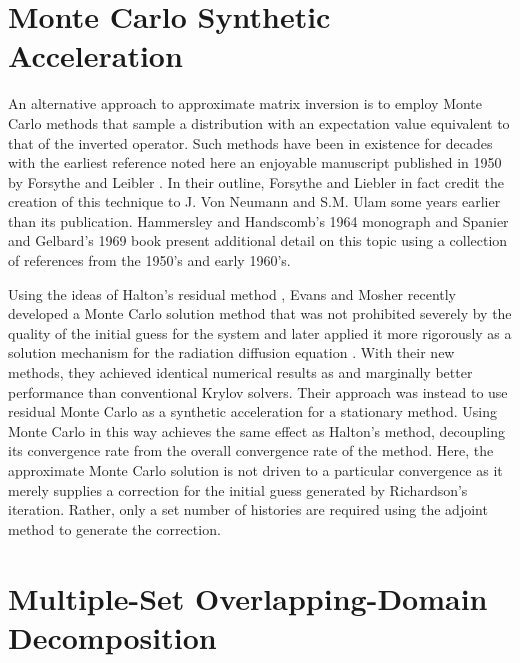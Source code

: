 \documentclass{snamc2013}
\begin{document}
\section{Monte Carlo Synthetic Acceleration}

An alternative approach to approximate matrix inversion is to employ
Monte Carlo methods that sample a distribution with an expectation
value equivalent to that of the inverted operator. Such methods have
been in existence for decades with the earliest reference noted here
an enjoyable manuscript published in 1950 by Forsythe and Leibler
\cite{forsythe_matrix_1950}. In their outline, Forsythe and Liebler in
fact credit the creation of this technique to J. Von Neumann and
S.M. Ulam some years earlier than its publication. Hammersley and
Handscomb's 1964 monograph \cite{hammersley_monte_1964} and Spanier
and Gelbard's 1969 book \cite{spanier_monte_1969} present additional
detail on this topic using a collection of references from the 1950's
and early 1960's.

Using the ideas of Halton's residual method
\cite{halton_sequential_1994}, Evans and Mosher recently developed a
Monte Carlo solution method that was not prohibited severely by the
quality of the initial guess for the system \cite{evans_monte_2009}
and later applied it more rigorously as a solution mechanism for the
radiation diffusion equation \cite{evans_monte_2012}. With their new
methods, they achieved identical numerical results as and marginally
better performance than conventional Krylov solvers. Their approach
was instead to use residual Monte Carlo as a synthetic acceleration
for a stationary method. Using Monte Carlo in this way achieves the
same effect as Halton's method, decoupling its convergence rate from
the overall convergence rate of the method. Here, the approximate
Monte Carlo solution is not driven to a particular convergence as it
merely supplies a correction for the initial guess generated by
Richardson's iteration. Rather, only a set number of histories are
required using the adjoint method to generate the correction.

\section{Multiple-Set Overlapping-Domain Decomposition}
\end{document}
